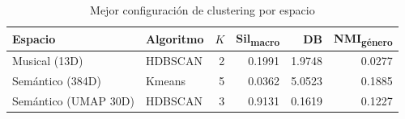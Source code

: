 \begin{table}[htbp]
  \centering
  \caption{Mejor configuración de clustering por espacio}
  \label{tab:clustering_best_configs}
  \begin{tabular}{llrrrr}
    \toprule
    Espacio & Algoritmo & $K$ & Sil\textsubscript{macro} & DB & NMI\textsubscript{género} \\
    \midrule
    Musical (13D) & HDBSCAN & 2 & 0.1991 & 1.9748 & 0.0277 \\
    Semántico (384D) & Kmeans & 5 & 0.0362 & 5.0523 & 0.1885 \\
    Semántico (UMAP 30D) & HDBSCAN & 3 & 0.9131 & 0.1619 & 0.1227 \\
    \bottomrule
  \end{tabular}
\end{table}
